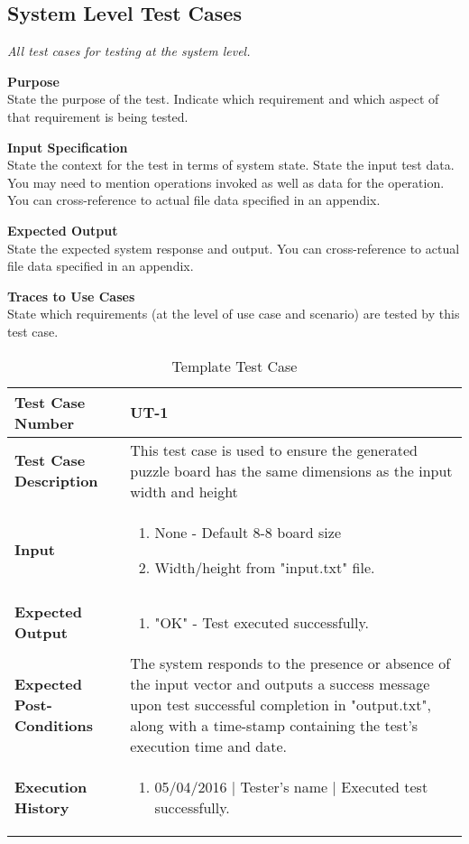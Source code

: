 \documentclass[12pt]{article}
\begin{document}
\subsection{System Level Test Cases}
{\it
All test cases for testing at the system level.}

\noindent
{\bf Purpose}\\
State the purpose of the test.
Indicate which requirement and which aspect of that requirement is being tested.

\noindent
{\bf Input Specification}\\
State the context for the test in terms of system state.
State the input test data. You may need to mention operations invoked as well as data for the operation.
You can cross-reference to actual file data specified in an appendix.

\noindent
{\bf Expected Output}\\
State the expected system response and output.
You can cross-reference to actual file data specified in an appendix.

\noindent
{\bf Traces to Use Cases}\\
State which requirements (at the level of use case and scenario) are tested by this test case.
\clearpage

\begin{table}[htbp]
\centering
\caption{Template Test Case}
\label{UT-1}
\begin{tabularx}{\textwidth}{ | l | X |}
\hline
\textbf{Test Case Number}      &  UT-1                         \\ \hline
\textbf{Test Case Description}    &  This test case is used to ensure the generated puzzle board has the same dimensions as the input width and height                \\ \hline
\textbf{Input}         & 	\begin{enumerate}
	\item None - Default 8-8 board size
	\item  Width/height from "input.txt" file. 
\end{enumerate} \\ \hline

\textbf{Expected Output}     & \begin{enumerate}
	\item "OK" - Test executed successfully.
\end{enumerate} \\ \hline
\textbf{Expected Post-Conditions}           &  The system responds to the presence or absence of the input vector and outputs a success message upon test successful completion in "output.txt", along with a time-stamp containing the test's execution time and date.                    \\ \hline
\textbf{Execution History}   &  \begin{enumerate}
	\item 05/04/2016 | Tester's name | Executed test successfully.
\end {enumerate} \\ \hline
\end{tabularx}
\end{table}
\clearpage
\end{document}
